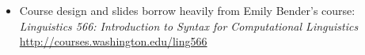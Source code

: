 \documentclass[a4paper,landscape,headrule,footrule]{foils}
\begin{document}
\avmfont{\it}

\maketitle





\begin{itemize}
\item Course design and slides borrow heavily from Emily Bender's course:
\textit{Linguistics 566: Introduction to Syntax for Computational Linguistics}
\\ \url{http://courses.washington.edu/ling566}
\end{itemize}


%
\end{document}
